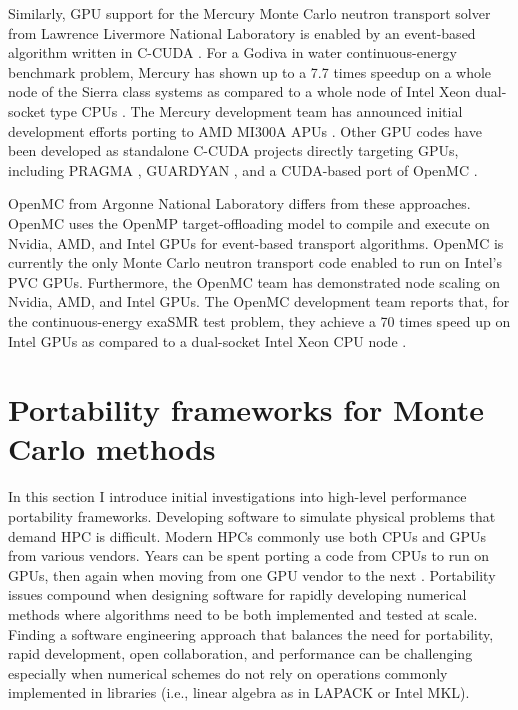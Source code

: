Similarly, GPU support for the Mercury Monte Carlo neutron transport solver from Lawrence Livermore National Laboratory is enabled by an event-based algorithm written in C-CUDA \cite{pozulp_progress_2023, pozulp_sna_2024}.
For a Godiva in water continuous-energy benchmark problem, Mercury has shown up to a 7.7 times speedup on a whole node of the Sierra class systems as compared to a whole node of Intel Xeon dual-socket type CPUs \cite{pozulp_progress_2023}.
The Mercury development team has announced initial development efforts porting to AMD MI300A APUs \cite{pozulp_sna_2024}.
Other GPU codes have been developed as standalone C-CUDA projects directly targeting GPUs, including PRAGMA \cite{choi_optimization_2021}, GUARDYAN \cite{molnar_gpu_based_2019}, and a CUDA-based port of OpenMC \cite{ridley2021}.

OpenMC from Argonne National Laboratory differs from these approaches.
OpenMC uses the OpenMP target-offloading model to compile and execute on Nvidia, AMD, and Intel GPUs for event-based transport algorithms.
OpenMC is currently the only Monte Carlo neutron transport code enabled to run on Intel's PVC GPUs.
Furthermore, the OpenMC team has demonstrated node scaling on Nvidia, AMD, and Intel GPUs.
The OpenMC development team reports that, for the continuous-energy exaSMR test problem, they achieve a 70 times speed up on Intel GPUs as compared to a dual-socket Intel Xeon CPU node \cite{tramm2024performanceportablemontecarlo}.


\section{Portability frameworks for Monte Carlo methods}

In this section I introduce initial investigations into high-level performance portability frameworks.
Developing software to simulate physical problems that demand HPC is difficult.
Modern HPCs commonly use both CPUs and GPUs from various vendors.
Years can be spent porting a code from CPUs to run on GPUs, then again when moving from one GPU vendor to the next \cite{pozulp_progress_2023}.
Portability issues compound when designing software for rapidly developing numerical methods where algorithms need to be both implemented and tested at scale.
Finding a software engineering approach that balances the need for portability, rapid development, open collaboration, and performance can be challenging especially when numerical schemes do not rely on operations commonly implemented in libraries  (i.e., linear algebra as in LAPACK or Intel MKL). 

